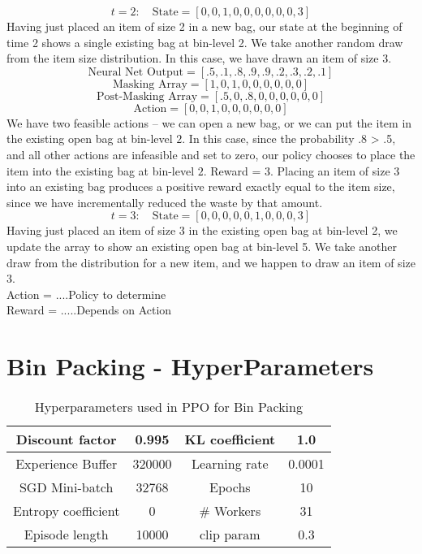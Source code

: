 \begin{appendices}
\[t = 2: \quad \text{State} = [0, 0, 1, 0, 0, 0, 0, 0, 0, 3]\]
Having just placed an item of size 2 in a new bag, our state at the beginning of time 2 shows a single existing bag at bin-level 2.  We take another random draw from the item size distribution.  In this case, we have drawn an item of size 3.
\[\text{Neural Net Output} = [.5, .1, .8, .9, .9, .2, .3, .2, .1]\]
\[\text{Masking Array} = [1, 0, 1, 0, 0, 0, 0, 0, 0]\]
\[\text{Post-Masking Array} = [.5, 0, .8, 0, 0, 0, 0, 0, 0]\]
\[\text{Action} = [0, 0, 1, 0, 0, 0, 0, 0, 0]\]
We have two feasible actions -- we can open a new bag, or we can put the item in the existing open bag at bin-level $2$.  In this case, since the probability .8 > .5, and all other actions are infeasible and set to zero, our policy chooses to place the item into the existing bag at bin-level $2$.
Reward = $3$. Placing an item of size 3 into an existing bag produces a positive reward exactly equal to the item size, since we have incrementally reduced the waste by that amount.
\[t=3: \quad \text{State} = [0, 0, 0, 0, 0, 1, 0, 0, 0, 3]\]
Having just placed an item of size 3 in the existing open bag at bin-level 2, we update the array to show an existing open bag at bin-level 5.  We take another draw from the distribution for a new item, and we happen to draw an item of size 3. \\
{\centering Action = ....Policy to determine}\\
{\centering Reward = .....Depends on Action}\\

\clearpage

\section{Bin Packing - HyperParameters}
\label{appendix:bin_size_hp}
\begin{table}[h!]
	\resizebox{\columnwidth}{!}
	{
		\centering
		\begin{tabular}{ |c|c|c|c| } 
			\hline
			Discount factor & 0.995 & KL coefficient & 1.0 \\
			\hline
			Experience Buffer & 320000 & Learning rate & 0.0001 \\
			\hline	
			SGD Mini-batch & 32768 & Epochs & 10 \\
			\hline
			Entropy coefficient & 0 & \# Workers & 31 \\
			\hline
			Episode length & 10000 & clip param & 0.3 \\
			\hline
		\end{tabular}
	}
	\caption{Hyperparameters used in PPO for Bin Packing}
	\label{table:bin_packing_hyperparam}
	\vspace{-1em}
\end{table}
\clearpage


\end{appendices}
